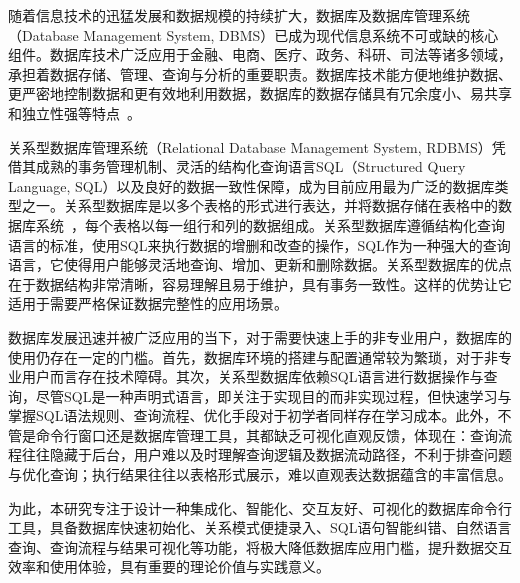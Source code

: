 \begin{CJK*}{UTF8}{song}
随着信息技术的迅猛发展和数据规模的持续扩大，数据库及数据库管理系统（Database Management System, DBMS）已成为现代信息系统不可或缺的核心组件。数据库技术广泛应用于金融、电商、医疗、政务、科研、司法等诸多领域，承担着数据存储、管理、查询与分析的重要职责。数据库技术能方便地维护数据、更严密地控制数据和更有效地利用数据，数据库的数据存储具有冗余度小、易共享和独立性强等特点~\cite{1}。

关系型数据库管理系统（Relational Database Management System, RDBMS）凭借其成熟的事务管理机制、灵活的结构化查询语言SQL（Structured Query Language, SQL）以及良好的数据一致性保障，成为目前应用最为广泛的数据库类型之一。关系型数据库是以多个表格的形式进行表达，并将数据存储在表格中的数据库系统~\cite{2}，每个表格以每一组行和列的数据组成。关系型数据库遵循结构化查询语言的标准，使用SQL来执行数据的增删和改查的操作，SQL作为一种强大的查询语言，它使得用户能够灵活地查询、增加、更新和删除数据。关系型数据库的优点在于数据结构非常清晰，容易理解且易于维护，具有事务一致性。这样的优势让它适用于需要严格保证数据完整性的应用场景。

数据库发展迅速并被广泛应用的当下，对于需要快速上手的非专业用户，数据库的使用仍存在一定的门槛。首先，数据库环境的搭建与配置通常较为繁琐，对于非专业用户而言存在技术障碍。其次，关系型数据库依赖SQL语言进行数据操作与查询，尽管SQL是一种声明式语言，即关注于实现目的而非实现过程，但快速学习与掌握SQL语法规则、查询流程、优化手段对于初学者同样存在学习成本。此外，不管是命令行窗口还是数据库管理工具，其都缺乏可视化直观反馈，体现在：查询流程往往隐藏于后台，用户难以及时理解查询逻辑及数据流动路径，不利于排查问题与优化查询；执行结果往往以表格形式展示，难以直观表达数据蕴含的丰富信息。

为此，本研究专注于设计一种集成化、智能化、交互友好、可视化的数据库命令行工具，具备数据库快速初始化、关系模式便捷录入、SQL语句智能纠错、自然语言查询、查询流程与结果可视化等功能，将极大降低数据库应用门槛，提升数据交互效率和使用体验，具有重要的理论价值与实践意义。

\end{CJK*}